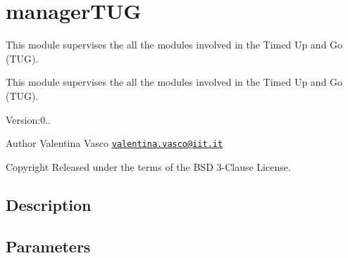 \section{manager\+T\+UG}
\label{group__managerTUG}


This module supervises the all the modules involved in the Timed Up and Go (T\+UG).  


This module supervises the all the modules involved in the Timed Up and Go (T\+UG). 

Version\+:0.. \begin{DoxyAuthor}{Author}
Valentina Vasco \href{mailto:valentina.vasco@iit.it}{\tt valentina.\+vasco@iit.\+it} ~\newline
 
\end{DoxyAuthor}
\begin{DoxyCopyright}{Copyright}
Released under the terms of the B\+SD 3-\/\+Clause License. 
\end{DoxyCopyright}
\hypertarget{group__skeletonViewer_intro_sec}{}\subsection{Description}\label{group__skeletonViewer_intro_sec}
\hypertarget{group__skeletonViewer_parameters_sec}{}\subsection{Parameters}\label{group__skeletonViewer_parameters_sec}

